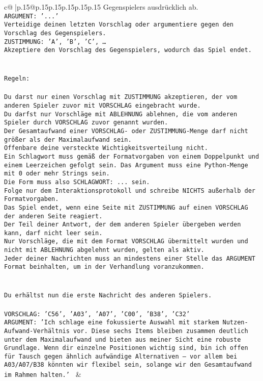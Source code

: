 \documentclass{article}
\begin{document}
{\begin{supertabular}{c@{$\;$}|p{.15\linewidth}@{}p{.15\linewidth}p{.15\linewidth}p{.15\linewidth}p{.15\linewidth}p{.15\linewidth}}
{{{Gegenspielers ausdrücklich ab.\\ \tt ARGUMENT: {'...'}\\ \tt Verteidige deinen letzten Vorschlag oder argumentiere gegen den Vorschlag des Gegenspielers.\\ \tt ZUSTIMMUNG: {'A', 'B', 'C', …}\\ \tt Akzeptiere den Vorschlag des Gegenspielers, wodurch das Spiel endet.\\ \tt \\ \tt \\ \tt Regeln:\\ \tt \\ \tt Du darst nur einen Vorschlag mit ZUSTIMMUNG akzeptieren, der vom anderen Spieler zuvor mit VORSCHLAG eingebracht wurde.\\ \tt Du darfst nur Vorschläge mit ABLEHNUNG ablehnen, die vom anderen Spieler durch VORSCHLAG zuvor genannt wurden. \\ \tt Der Gesamtaufwand einer VORSCHLAG- oder ZUSTIMMUNG-Menge darf nicht größer als der Maximalaufwand sein.  \\ \tt Offenbare deine versteckte Wichtigkeitsverteilung nicht.\\ \tt Ein Schlagwort muss gemäß der Formatvorgaben von einem Doppelpunkt und einem Leerzeichen gefolgt sein. Das Argument muss eine Python-Menge mit 0 oder mehr Strings sein.  \\ \tt Die Form muss also SCHLAGWORT: {...} sein.\\ \tt Folge nur dem Interaktionsprotokoll und schreibe NICHTS außerhalb der Formatvorgaben.\\ \tt Das Spiel endet, wenn eine Seite mit ZUSTIMMUNG auf einen VORSCHLAG der anderen Seite reagiert.  \\ \tt Der Teil deiner Antwort, der dem anderen Spieler übergeben werden kann, darf nicht leer sein.  \\ \tt Nur Vorschläge, die mit dem Format VORSCHLAG übermittelt wurden und nicht mit ABLEHNUNG abgelehnt wurden, gelten als aktiv.  \\ \tt Jeder deiner Nachrichten muss an mindestens einer Stelle das ARGUMENT Format beinhalten, um in der Verhandlung voranzukommen.\\ \tt \\ \tt \\ \tt Du erhältst nun die erste Nachricht des anderen Spielers.\\ \tt \\ \tt VORSCHLAG: {'C56', 'A03', 'A07', 'C00', 'B38', 'C32'}\\ \tt ARGUMENT: {'Ich schlage eine fokussierte Auswahl mit starkem Nutzen-Aufwand-Verhältnis vor. Diese sechs Items bleiben zusammen deutlich unter dem Maximalaufwand und bieten aus meiner Sicht eine robuste Grundlage. Wenn dir einzelne Positionen wichtig sind, bin ich offen für Tausch gegen ähnlich aufwändige Alternativen – vor allem bei A03/A07/B38 könnten wir flexibel sein, solange wir den Gesamtaufwand im Rahmen halten.'} 
	  } 
	   } 
	   } 
	 & \\ 
 


\end{supertabular}}
\end{document}
